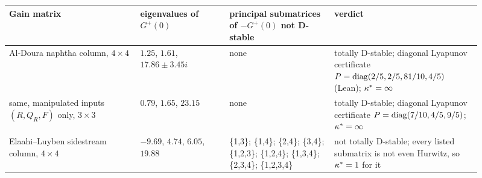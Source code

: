 \begin{tabular}{@{}L{0.25\linewidth}L{0.17\linewidth}L{0.2\linewidth}L{0.29\linewidth}@{}}
\toprule
Gain matrix & eigenvalues of $G^{+}(0)$ & principal submatrices of $-G^{+}(0)$ not D-stable & verdict \\
\midrule
Al-Doura naphtha column, $4\times4$~\cite{MahmoodAlzobai2026} & $1.25$, $1.61$, $17.86\pm3.45i$ & none & totally D-stable; diagonal Lyapunov certificate $P=\operatorname{diag}(2/5,2/5,81/10,4/5)$ (Lean); $\kappa^{*}=\infty$ \\
same, manipulated inputs $(R,Q_R,F)$ only, $3\times3$ & $0.79$, $1.65$, $23.15$ & none & totally D-stable; diagonal Lyapunov certificate $P=\operatorname{diag}(7/10,4/5,9/5)$; $\kappa^{*}=\infty$ \\
Elaahi--Luyben sidestream column, $4\times4$~\cite{ElaahiLuyben1985,SkogestadMorari1992} & $-9.69$, $4.74$, $6.05$, $19.88$ & \{1,3\}; \{1,4\}; \{2,4\}; \{3,4\}; \{1,2,3\}; \{1,2,4\}; \{1,3,4\}; \{2,3,4\}; \{1,2,3,4\} & not totally D-stable; every listed submatrix is not even Hurwitz, so $\kappa^{*}=1$ for it \\
\bottomrule
\end{tabular}

